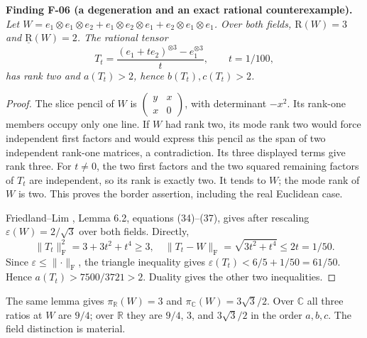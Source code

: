 \documentclass[11pt]{article}
\newcommand{\R}{\mathbb R}\newcommand{\C}{\mathbb C}
\newcommand{\BR}{\underline{\mathrm R}}\newcommand{\TR}{\mathrm R}
\newcommand{\HS}[1]{\lVert #1\rVert_{\mathrm F}}
\newcommand{\eps}{\varepsilon}
\newenvironment{finding}[2]{\par\medskip\noindent\textbf{Finding #1 (#2).}\ \itshape}{\par\medskip}
\begin{document}
\begin{finding}{F-06}{a degeneration and an exact rational counterexample}
Let $W=e_1\otimes e_1\otimes e_2+
e_1\otimes e_2\otimes e_1+
e_2\otimes e_1\otimes e_1$. Over both fields,
$\TR(W)=3$ and $\BR(W)=2$. The rational tensor
\[
 T_t=\frac{(e_1+t e_2)^{\otimes3}-e_1^{\otimes3}}t,\qquad t=1/100,
\]
has rank two and $a(T_t)>2$, hence $b(T_t),c(T_t)>2$.
\end{finding}
\begin{proof}
The slice pencil of $W$ is
$\left(\begin{smallmatrix}y&x\\x&0\end{smallmatrix}\right)$,
with determinant $-x^2$. Its rank-one members occupy only one
line. If $W$ had rank two, its mode rank two would force independent
first factors and would express this pencil as the span of two
independent rank-one matrices, a contradiction. Its three displayed
terms give rank three. For $t\ne0$, the two first factors and the
two squared remaining factors of $T_t$ are independent, so its rank
is exactly two. It tends to $W$; the mode rank of $W$ is two.
This proves the border assertion, including the real Euclidean case.

Friedland--Lim \cite{FL}, Lemma 6.2, equations (34)--(37), gives
after rescaling $\eps(W)=2/\sqrt3$ over both fields. Directly,
\[
 \HS{T_t}^2=3+3t^2+t^4\geq3,\quad
 \HS{T_t-W}=\sqrt{3t^2+t^4}\leq2t=1/50.
\]
Since $\eps\leq\HS{\cdot}$, the triangle inequality gives
$\eps(T_t)<6/5+1/50=61/50$. Hence
$a(T_t)>7500/3721>2$. Duality gives the other two inequalities.
\end{proof}
The same lemma gives $\pi_\R(W)=3$ and
$\pi_\C(W)=3\sqrt3/2$. Over $\C$ all three ratios at $W$ are $9/4$;
over $\R$ they are $9/4$, $3$, and $3\sqrt3/2$ in the order
$a,b,c$. The field distinction is material.
\end{document}
